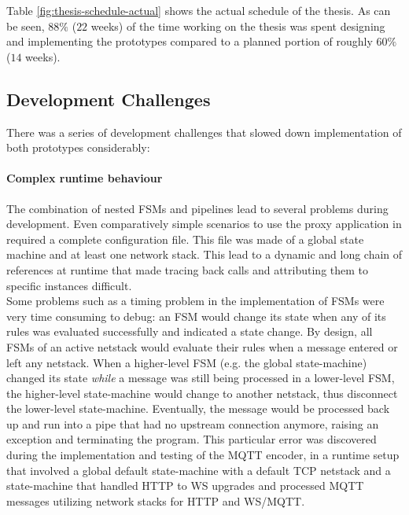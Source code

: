 Table \ref{fig:thesis-schedule-actual} shows the actual schedule of the thesis. As can be seen, $88\%$ ($22$ weeks) of the time working on the thesis was spent designing and implementing the prototypes compared to a planned portion of roughly $60\%$ ($14$ weeks).


\subsection{Development Challenges}
\label{sec:pm-challenges}
There was a series of development challenges that slowed down implementation of both prototypes considerably:
\paragraph{Complex runtime behaviour} The combination of nested \acp{FSM} and pipelines lead to several problems during development. Even comparatively simple scenarios to use the proxy application in required a complete configuration file. This file was made of a global state machine and at least one network stack. This lead to a dynamic and long chain of references at runtime that made tracing back calls and attributing them to specific instances difficult.\\
Some problems such as a timing problem in the implementation of \acp{FSM} were very time consuming to debug: an \ac{FSM} would change its state when any of its rules was evaluated successfully and indicated a state change. By design, all \acp{FSM} of an active netstack would evaluate their rules when a message entered or left any netstack. When a higher-level \ac{FSM} (e.g. the global state-machine) changed its state \emph{while} a message was still being processed in a lower-level \ac{FSM}, the higher-level state-machine would change to another netstack, thus disconnect the lower-level state-machine. Eventually, the message would be processed back up and run into a pipe that had no upstream connection anymore, raising an exception and terminating the program. This particular error was discovered during the implementation and testing of the \ac{MQTT} encoder, in a runtime setup that involved a global default state-machine with a default \ac{TCP} netstack and a state-machine that handled \ac{HTTP} to \ac{WS} upgrades and processed \ac{MQTT} messages utilizing network stacks for \ac{HTTP} and \ac{WS}/\ac{MQTT}.\\

